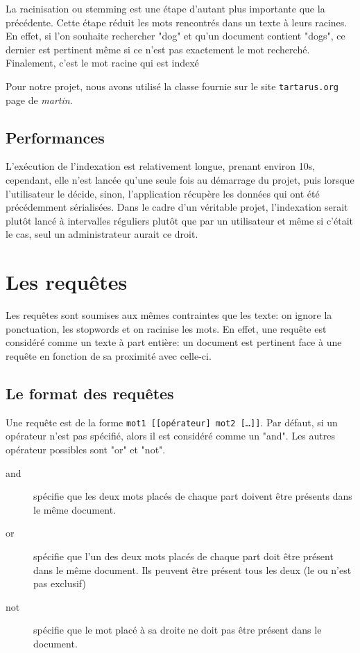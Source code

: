 \documentclass[a4paper,10pt]{report}
\begin{document}
La racinisation ou stemming est une \'etape d'autant plus importante que la pr\'ec\'edente. Cette \'etape r\'eduit les mots rencontr\'es dans un texte \`a leurs racines. En effet, si l'on souhaite rechercher "dog" et qu'un document contient "dogs", ce dernier est pertinent m\^eme si ce n'est pas exactement le mot recherch\'e. Finalement, c'est le mot racine qui est index\'e 

Pour notre projet, nous avons utilis\'e la classe fournie sur le site \texttt{tartarus.org} page de \textit{martin}.

\subsection{Performances}

L'ex\'ecution de l'indexation est relativement longue, prenant environ 10s, cependant, elle n'est lancée qu'une seule fois au démarrage du projet, puis lorsque l'utilisateur le décide, sinon, l'application r\'ecup\`ere les donn\'ees qui ont \'et\'e pr\'ec\'edemment s\'erialis\'ees. Dans le cadre d'un véritable projet, l'indexation serait plutôt lancé à intervalles réguliers plutôt que par un utilisateur et même si c'était le cas, seul un administrateur aurait ce droit.

\section{Les requ\^etes}

Les requ\^etes sont soumises aux m\^emes contraintes que les texte: on ignore la ponctuation, les stopwords et on racinise les mots. En effet, une requ\^ete est consid\'er\'e comme un texte \`a part enti\`ere: un document est pertinent face \`a une requ\^ete en fonction de sa proximit\'e avec celle-ci.

\subsection{Le format des requ\^etes}

Une requ\^ete est de la forme \texttt{mot1 \verb?[?\verb?[?op\'erateur\verb?]? mot2 \verb?[?\ldots\verb?]]?}. Par d\'efaut, si un op\'erateur n'est pas sp\'ecifi\'e, alors il est consid\'er\'e comme un "and". Les autres op\'erateur possibles sont "or" et "not". 

\begin{description}
 \item[and] sp\'ecifie que les deux mots plac\'es de chaque part doivent \^etre pr\'esents dans le m\^eme document.
 \item[or] sp\'ecifie que l'un des deux mots plac\'es de chaque part doit \^etre pr\'esent dans le m\^eme document. Ils peuvent \^etre pr\'esent tous les deux (le ou n'est pas exclusif)
 \item[not] sp\'ecifie que le mot plac\'e \`a sa droite ne doit pas \^etre pr\'esent dans le document.
\end{description}
\end{document}
